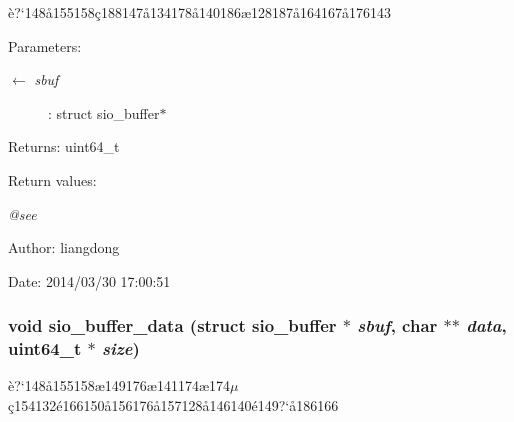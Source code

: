 \`{e}?`148\aa{}155158\c{c}188147\aa{}134178\aa{}140186\ae{}128187\aa{}164167\aa{}176143 

\begin{Desc}
\item[Parameters:]
\begin{description}
\item[\mbox{$\leftarrow$} {\em sbuf}]: struct sio\_\-buffer$\ast$ \end{description}
\end{Desc}
\begin{Desc}
\item[Returns:]uint64\_\-t \end{Desc}
\begin{Desc}
\item[Return values:]
\begin{description}
\item[{\em @see}]\end{description}
\end{Desc}
\begin{Desc}
\item[Author:]liangdong \end{Desc}
\begin{Desc}
\item[Date:]2014/03/30 17:00:51 \end{Desc}
\subsubsection{\setlength{\rightskip}{0pt plus 5cm}void sio\_\-buffer\_\-data (struct sio\_\-buffer $\ast$ {\em sbuf}, char $\ast$$\ast$ {\em data}, uint64\_\-t $\ast$ {\em size})}\label{sio__buffer_8c_a11}


\`{e}?`148\aa{}155158\ae{}149176\ae{}141174\ae{}174$\mu$\c{c}154132\'{e}166150\aa{}156176\aa{}157128\aa{}146140\'{e}149?`\aa{}186166 

